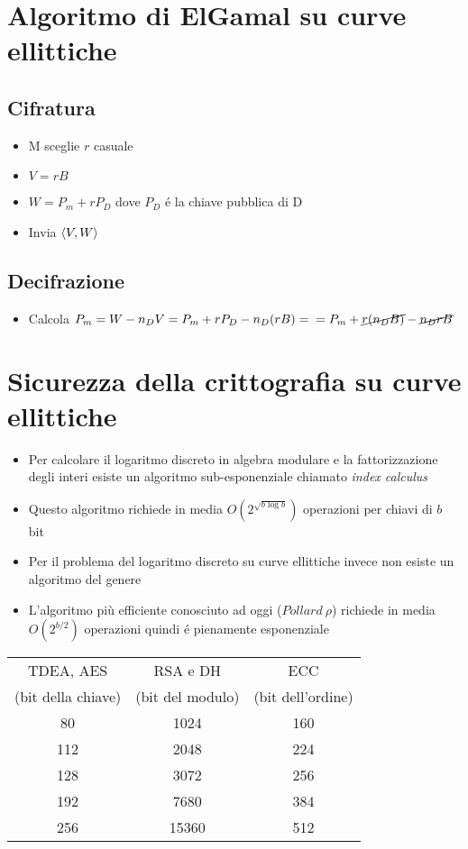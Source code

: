 \section{Algoritmo di ElGamal su curve ellittiche}

\subsection{Cifratura}

\begin{itemize}
    \item M sceglie $r$ casuale
    \item $V = rB$
    \item $W = P_m + rP_D$ dove $P_D$ \'e la chiave pubblica di D
    \item Invia $\langle V,W\rangle$
\end{itemize}
\subsection{Decifrazione}
\begin{itemize}
    \item Calcola $P_m = W - n_DV = P_m + rP_D - n_D(rB) =\\= P_m + \cancel{r(n_DB)} - \cancel{n_DrB}$
\end{itemize}

\section{Sicurezza della crittografia su curve ellittiche}

\begin{itemize}
    \item Per calcolare il logaritmo discreto in algebra modulare e la fattorizzazione degli interi esiste un algoritmo sub-esponenziale chiamato \textit{index calculus}
    \item Questo algoritmo richiede in media $O(2^{\sqrt{b \log b}})$ operazioni per chiavi di $b$ bit
    \item Per il problema del logaritmo discreto su curve ellittiche invece non esiste un algoritmo del genere
    \item L'algoritmo pi\`u efficiente conosciuto ad oggi ($Pollard\ \rho$) richiede in media $O(2^{b/2})$ operazioni quindi \'e pienamente esponenziale
\end{itemize}

\begin{center}
    \begin{tabular}{|c|c|c|}
        \hline
        TDEA, AES & RSA e DH & ECC\\
        (bit della chiave) & (bit del modulo) & (bit dell'ordine)\\
        \hline
        80 & 1024 & 160\\
        112 & 2048 & 224\\
        128 & 3072 & 256\\
        192 & 7680 & 384\\
        256 & 15360 & 512\\
        \hline
    \end{tabular}
\end{center}